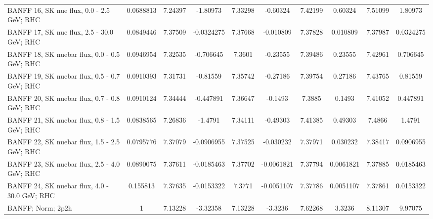 \begin{tabular}{| l | S | S  S | S  S | S  S | S  S | }
                                       BANFF 16, SK nue flux, 0.0 - 2.5 GeV; RHC &       0.0688813 &         7.24397 &        -1.80973 &         7.33298 &        -0.60324 &         7.42199 &         0.60324 &         7.51099 &         1.80973 \\ 
                                      BANFF 17, SK nue flux, 2.5 - 30.0 GeV; RHC &       0.0849446 &         7.37509 &      -0.0324275 &         7.37668 &       -0.010809 &         7.37828 &        0.010809 &         7.37987 &       0.0324275 \\ 
                                    BANFF 18, SK nuebar flux, 0.0 - 0.5 GeV; RHC &       0.0946954 &         7.32535 &       -0.706645 &          7.3601 &        -0.23555 &         7.39486 &         0.23555 &         7.42961 &        0.706645 \\ 
                                    BANFF 19, SK nuebar flux, 0.5 - 0.7 GeV; RHC &       0.0910393 &         7.31731 &        -0.81559 &         7.35742 &        -0.27186 &         7.39754 &         0.27186 &         7.43765 &         0.81559 \\ 
                                    BANFF 20, SK nuebar flux, 0.7 - 0.8 GeV; RHC &       0.0910124 &         7.34444 &       -0.447891 &         7.36647 &         -0.1493 &          7.3885 &          0.1493 &         7.41052 &        0.447891 \\ 
                                    BANFF 21, SK nuebar flux, 0.8 - 1.5 GeV; RHC &       0.0838565 &         7.26836 &         -1.4791 &         7.34111 &        -0.49303 &         7.41385 &         0.49303 &          7.4866 &          1.4791 \\ 
                                    BANFF 22, SK nuebar flux, 1.5 - 2.5 GeV; RHC &       0.0795776 &         7.37079 &      -0.0906955 &         7.37525 &       -0.030232 &         7.37971 &        0.030232 &         7.38417 &       0.0906955 \\ 
                                    BANFF 23, SK nuebar flux, 2.5 - 4.0 GeV; RHC &       0.0890075 &         7.37611 &      -0.0185463 &         7.37702 &      -0.0061821 &         7.37794 &       0.0061821 &         7.37885 &       0.0185463 \\ 
                                   BANFF 24, SK nuebar flux, 4.0 - 30.0 GeV; RHC &        0.155813 &         7.37635 &      -0.0153322 &          7.3771 &      -0.0051107 &         7.37786 &       0.0051107 &         7.37861 &       0.0153322 \\ 
                                                               BANFF; Norm; 2p2h &               1 &         7.13228 &        -3.32358 &         7.13228 &         -3.3236 &         7.62268 &          3.3236 &         8.11307 &         9.97075 \\ 

\end{tabular}
